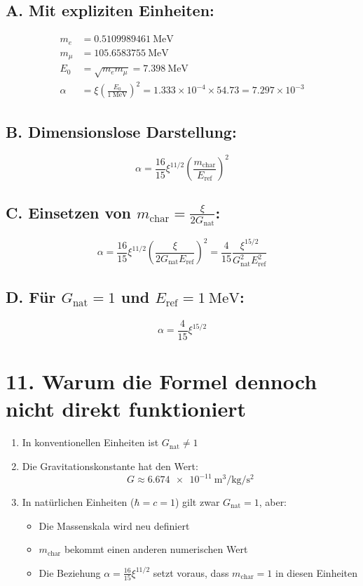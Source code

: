 \documentclass[12pt, a4paper]{article}
\begin{document}
	\subsection*{A. Mit expliziten Einheiten:}
	\begin{align*}
		m_e &= \SI{0.5109989461}{\MeV} \\
		m_\mu &= \SI{105.6583755}{\MeV} \\
		E_0 &= \sqrt{m_e m_\mu} = \SI{7.398}{\MeV} \\
		\alpha &= \xi \left(\frac{E_0}{\SI{1}{\MeV}}\right)^2 = 1.333 \times 10^{-4} \times 54.73 = 7.297 \times 10^{-3}
	\end{align*}
	
	\subsection*{B. Dimensionslose Darstellung:}
	\[
	\boxed{\alpha = \frac{16}{15} \xi^{11/2} \left(\frac{m_{\text{char}}}{E_{\text{ref}}}\right)^2}
	\]
	
	\subsection*{C. Einsetzen von $m_{\text{char}} = \frac{\xi}{2G_{\text{nat}}}$:}
	\[
	\alpha = \frac{16}{15} \xi^{11/2} \left(\frac{\xi}{2G_{\text{nat}} E_{\text{ref}}}\right)^2 = \frac{4}{15} \frac{\xi^{15/2}}{G_{\text{nat}}^2 E_{\text{ref}}^2}
	\]
	
	\subsection*{D. Für $G_{\text{nat}} = 1$ und $E_{\text{ref}} = \SI{1}{\MeV}$:}
	\[
	\alpha = \frac{4}{15} \xi^{15/2}
	\]
	
	\section*{11. Warum die Formel dennoch nicht direkt funktioniert}
	
	\begin{enumerate}
		\item In konventionellen Einheiten ist $G_{\text{nat}} \neq 1$
		\item Die Gravitationskonstante hat den Wert:
		\[
		G \approx \SI{6.674e-11}{\cubic\meter\per\kg\per\square\second}
		\]
		\item In natürlichen Einheiten ($\hbar = c = 1$) gilt zwar $G_{\text{nat}} = 1$, aber:
		\begin{itemize}
			\item Die Massenskala wird neu definiert
			\item $m_{\text{char}}$ bekommt einen anderen numerischen Wert
			\item Die Beziehung $\alpha = \frac{16}{15} \xi^{11/2}$ setzt voraus, dass $m_{\text{char}} = 1$ in diesen Einheiten
		\end{itemize}
	\end{enumerate}
	
\end{document}
